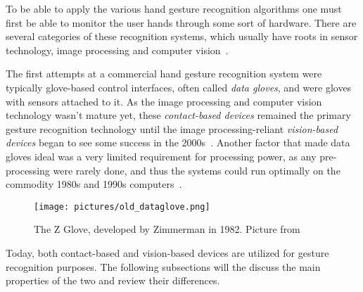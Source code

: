 To be able to apply the various hand gesture recognition algorithms one must first be able to monitor the user hands through some sort of hardware. 
There are several categories of these recognition systems, which usually have roots in sensor technology, 
image processing and computer vision~\citep{Vafadar2014}.

The first attempts at a commercial hand gesture recognition system were typically glove-based control interfaces, often called \textit{data gloves},
and were gloves with sensors attached to it. As the image processing and computer vision technology wasn't mature yet, these \textit{contact-based devices} remained 
the primary gesture recognition technology until the image processing-reliant \textit{vision-based devices} began to see some success in the 2000s~\citep{Premaratne2014}.
Another factor that made data gloves ideal was a very limited requirement for processing power, as any pre-processing were rarely done, 
and thus the systems could run optimally on the commodity 1980s and 1990s computers~\citep{Premaratne2014}.  


\begin{figure}%
	\texttt{[image: pictures/old\_dataglove.png]}
	\caption[The Z Glove]{The Z Glove, developed by Zimmerman in 1982. Picture from \citet{Premaratne2014}}
	\label{fig:old_dataglove}
\end{figure} 

Today, both contact-based and vision-based devices are utilized for gesture recognition purposes. 
The following subsections will the discuss the main properties of the two and review their differences.

